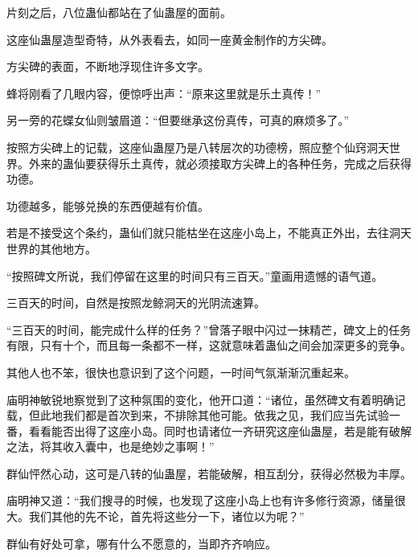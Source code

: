 \begin{this_body}
片刻之后，八位蛊仙都站在了仙蛊屋的面前。

这座仙蛊屋造型奇特，从外表看去，如同一座黄金制作的方尖碑。

方尖碑的表面，不断地浮现住许多文字。

蜂将刚看了几眼内容，便惊呼出声：“原来这里就是乐土真传！”

另一旁的花蝶女仙则皱眉道：“但要继承这份真传，可真的麻烦多了。”

按照方尖碑上的记载，这座仙蛊屋乃是八转层次的功德榜，照应整个仙窍洞天世界。外来的蛊仙要获得乐土真传，就必须接取方尖碑上的各种任务，完成之后获得功德。

功德越多，能够兑换的东西便越有价值。

若是不接受这个条约，蛊仙们就只能枯坐在这座小岛上，不能真正外出，去往洞天世界的其他地方。

“按照碑文所说，我们停留在这里的时间只有三百天。”童画用遗憾的语气道。

三百天的时间，自然是按照龙鲸洞天的光阴流速算。

“三百天的时间，能完成什么样的任务？”曾落子眼中闪过一抹精芒，碑文上的任务有限，只有十个，而且每一条都不一样，这就意味着蛊仙之间会加深更多的竞争。

其他人也不笨，很快也意识到了这个问题，一时间气氛渐渐沉重起来。

庙明神敏锐地察觉到了这种氛围的变化，他开口道：“诸位，虽然碑文有着明确记载，但此地我们都是首次到来，不排除其他可能。依我之见，我们应当先试验一番，看看能否出得了这座小岛。同时也请诸位一齐研究这座仙蛊屋，若是能有破解之法，将其收入囊中，也是绝妙之事啊！”

群仙怦然心动，这可是八转的仙蛊屋，若能破解，相互刮分，获得必然极为丰厚。

庙明神又道：“我们搜寻的时候，也发现了这座小岛上也有许多修行资源，储量很大。我们其他的先不论，首先将这些分一下，诸位以为呢？”

群仙有好处可拿，哪有什么不愿意的，当即齐齐响应。

\end{this_body}

